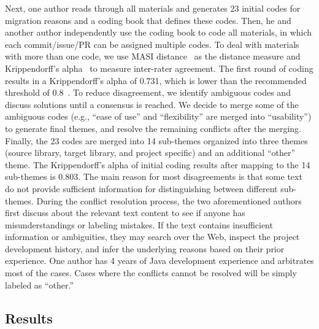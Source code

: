 \documentclass[sigconf, screen]{acmart}
\begin{document}
Next, one author reads through all materials and generates 23 initial codes for migration reasons and a coding book that defines these codes.
Then, he and another author independently use the coding book to code all materials, in which each commit/issue/PR can be assigned multiple codes.
To deal with materials with more than one code, we use MASI distance~\cite{passonneau2006measuring} as the distance measure and Krippendorff's alpha~\cite{krippendorff2011computing} to measure inter-rater agreement. The first round of coding results in a Krippendorff's alpha of 0.731, which is lower than the recommended threshold of 0.8~\cite{krippendorff2018content}.
To reduce disagreement, we identify ambiguous codes and discuss solutions until a consensus is reached.
We decide to merge some of the ambiguous codes (e.g., ``ease of use'' and ``flexibility'' are merged into ``usability'') to generate final themes, and resolve the remaining conflicts after the merging.
Finally, the 23 codes are merged into 14 sub-themes organized into three themes (source library, target library, and project specific) and an additional ``other'' theme.
The Krippendorff's alpha of initial coding results after mapping to the 14 sub-themes is 0.803.
The main reason for most disagreements is that some text do not provide sufficient information for distinguishing between different sub-themes.
During the conflict resolution process, the two aforementioned authors first discuss about the relevant text content to see if anyone has misunderstandings or labeling mistakes.
If the text contains insufficient information or ambiguities, they may search over the Web, inspect the project development history, and infer the underlying reasons based on their prior experience.
One author has 4 years of Java development experience and arbitrates most of the cases.
Cases where the conflicts cannot be resolved will be simply labeled as ``other.''

\subsection{Results}
\end{document}
